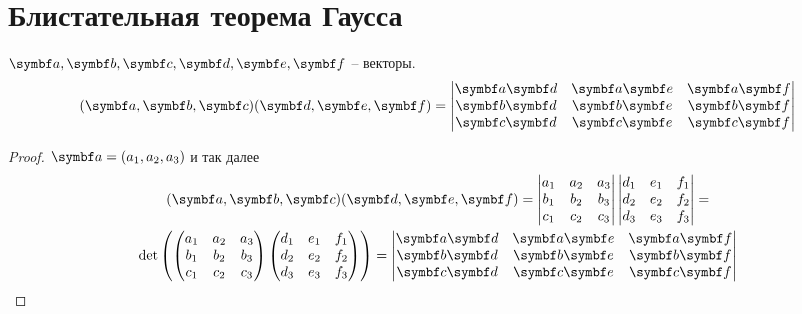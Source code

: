 \documentclass[main]{subfiles}
\begin{document}
\section{Блистательная теорема Гаусса}
\begin{lemma}\label{touching_paraboloid:cross_product_lemma}
    $\va, \vb, \vc, \vd, \ve, \vf$ -- векторы.
    \[(\va, \vb, \vc)(\vd, \ve,\vf) = \begin{vmatrix}
            \va\vd & \va\ve & \va\vf \\
            \vb\vd & \vb\ve & \vb\vf \\
            \vc\vd & \vc\ve & \vc\vf
        \end{vmatrix}\]
\end{lemma}
\begin{proof}
    $\va = (a_1, a_2, a_3)$ и так далее
    \begin{multline*}
        (\va, \vb, \vc)(\vd, \ve, \vf) = \begin{vmatrix}
            a_1 & a_2 & a_3 \\
            b_1 & b_2 & b_3 \\
            c_1 & c_2 & c_3
        \end{vmatrix}
        \begin{vmatrix}
            d_1 & e_1 & f_1 \\
            d_2 & e_2 & f_2 \\
            d_3 & e_3 & f_3
        \end{vmatrix}
        = \\
        \det \left( \begin{pmatrix}
            a_1 & a_2 & a_3 \\
            b_1 & b_2 & b_3 \\
            c_1 & c_2 & c_3
        \end{pmatrix}
        \begin{pmatrix}
            d_1 & e_1 & f_1 \\
            d_2 & e_2 & f_2 \\
            d_3 & e_3 & f_3
        \end{pmatrix}\right) =
        \begin{vmatrix}
            \va\vd & \va\ve & \va\vf \\
            \vb\vd & \vb\ve & \vb\vf \\
            \vc\vd & \vc\ve & \vc\vf
        \end{vmatrix}
    \end{multline*}
\end{proof}
\end{document}
